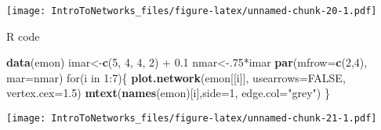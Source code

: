 \documentclass[]{book}
\newenvironment{Shaded}{\begin{snugshade}}{\end{snugshade}}
\newcommand{\KeywordTok}[1]{\textcolor[rgb]{0.13,0.29,0.53}{\textbf{{#1}}}}
\newcommand{\DataTypeTok}[1]{\textcolor[rgb]{0.13,0.29,0.53}{{#1}}}
\newcommand{\DecValTok}[1]{\textcolor[rgb]{0.00,0.00,0.81}{{#1}}}
\newcommand{\FloatTok}[1]{\textcolor[rgb]{0.00,0.00,0.81}{{#1}}}
\newcommand{\StringTok}[1]{\textcolor[rgb]{0.31,0.60,0.02}{{#1}}}
\newcommand{\OtherTok}[1]{\textcolor[rgb]{0.56,0.35,0.01}{{#1}}}
\newcommand{\NormalTok}[1]{{#1}}
\theoremstyle{definition}
\theoremstyle{definition}
\theoremstyle{definition}
\theoremstyle{remark}
\begin{document}
\texttt{[image: IntroToNetworks\_files/figure-latex/unnamed-chunk-20-1.pdf]}

R code

\begin{Shaded}
\begin{Highlighting}[]
\KeywordTok{data}\NormalTok{(emon)}
\NormalTok{imar<-}\KeywordTok{c}\NormalTok{(}\DecValTok{5}\NormalTok{, }\DecValTok{4}\NormalTok{, }\DecValTok{4}\NormalTok{, }\DecValTok{2}\NormalTok{) +}\StringTok{ }\FloatTok{0.1}
\NormalTok{nmar<-.}\DecValTok{75}\NormalTok{*imar}
\KeywordTok{par}\NormalTok{(}\DataTypeTok{mfrow=}\KeywordTok{c}\NormalTok{(}\DecValTok{2}\NormalTok{,}\DecValTok{4}\NormalTok{), }\DataTypeTok{mar=}\NormalTok{nmar)}
\NormalTok{for(i in }\DecValTok{1}\NormalTok{:}\DecValTok{7}\NormalTok{)\{}
  \KeywordTok{plot.network}\NormalTok{(emon[[i]], }\DataTypeTok{usearrows=}\OtherTok{FALSE}\NormalTok{, }\DataTypeTok{vertex.cex=}\FloatTok{1.5}\NormalTok{)}
     \KeywordTok{mtext}\NormalTok{(}\KeywordTok{names}\NormalTok{(emon)[i],}\DataTypeTok{side=}\DecValTok{1}\NormalTok{, }\DataTypeTok{edge.col=}\StringTok{"grey"}\NormalTok{)}
    \NormalTok{\}}
\end{Highlighting}
\end{Shaded}

\texttt{[image: IntroToNetworks\_files/figure-latex/unnamed-chunk-21-1.pdf]}
\end{document}
